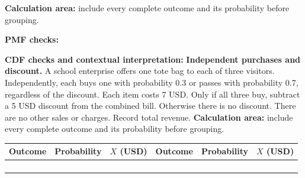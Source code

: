 \textbf{Calculation area:} include every complete outcome and its probability before grouping.
\par%
\noindent%
\begin{minipage}[t]{.37\linewidth}%
  \vspace{0pt}\centering
\end{minipage}%
\hfill%
\begin{minipage}[t]{.60\linewidth}%
  \vspace{0pt}\centering
\end{minipage}%
\par
\textbf{PMF checks:} \hrulefill%
\par
{}
\par%
\noindent%
\begin{minipage}[t]{.37\linewidth}%
  \vspace{0pt}\centering
\end{minipage}%
\hfill%
\begin{minipage}[t]{.60\linewidth}%
  \vspace{0pt}\centering
\end{minipage}%
\par
\textbf{CDF checks and contextual interpretation:}
\vfill
\clearpage
{}
\textbf{Independent purchases and discount.} A school enterprise offers one tote bag to each of three
visitors. Independently, each buys one with probability 0.3 or passes with probability 0.7, regardless of the
discount. Each item costs 7 USD. Only if all three buy, subtract a 5 USD discount from the combined bill.
Otherwise there is no discount. There are no other sales or charges. Record total revenue.
\textbf{Calculation area:} include every complete outcome and its probability before grouping.
\par%
\noindent%
\begin{tabularx}{\linewidth}{|Y|Y|Y|Y|Y|Y|}%
  \hline Outcome & Probability & $X$ (USD) & Outcome & Probability & $X$ (USD)\\%
  \hline
  \rule{0pt}{.63cm}& & & & & \\%
  \hline
  \rule{0pt}{.63cm}& & & & & \\%
  \hline
  \rule{0pt}{.63cm}& & & & & \\%
  \hline
  \rule{0pt}{.63cm}& & & & & \\%
  \hline
\end{tabularx}
